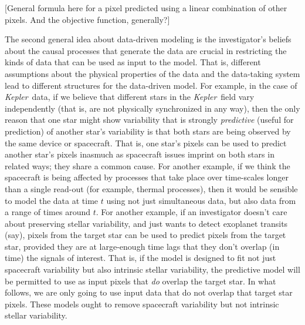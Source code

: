 \documentclass[12pt, preprint]{aastex}
\newcommand{\project}[1]{\textsl{#1}}
\newcommand{\Kepler}{\project{Kepler}}
\begin{document}
[General formula here for a pixel predicted using a linear combination of other pixels.
  And the objective function, generally?]

The second general idea about data-driven modeling is the investigator's beliefs
  about the causal processes that generate the data
  are crucial in restricting the kinds of data that can be used as input to the model.
That is, different assumptions about the physical properties of the data
  and the data-taking system
  lead to different structures for the data-driven model.
For example, in the case of \Kepler\ data,
  if we believe that different stars in the \Kepler\ field vary independently
  (that is, are not physically synchronized in any way),
  then the only reason that one star might show variability that is strongly \emph{predictive}
  (useful for prediction) of another star's variability
  is that both stars are being observed by the same device or spacecraft.
That is, one star's pixels can be used to predict another star's pixels
  inasmuch as spacecraft issues imprint on both stars in related ways;
  they share a common cause.
For another example, if we think the spacecraft is being affected by
  processes that take place over time-scales longer than a single read-out
  (for example, thermal processes),
  then it would be sensible to model the data at time $t$ using not just simultaneous data,
  but also data from a range of times around $t$.
For another example, if an investigator doesn't care about preserving stellar variability,
  and just wants to detect exoplanet transits (say),
  pixels from the target star can be used to predict pixels from the target star,
  provided they are at large-enough time lags that they don't overlap (in time)
  the signals of interest.
That is, if the model is designed to fit not just spacecraft variability
  but also intrinsic stellar variability,
  the predictive model will be permitted to use as input pixels that \emph{do} overlap the target star.
In what follows, we are only going to use input data that do not overlap that target star pixels.
These models ought to remove spacecraft variability but not intrinsic stellar variability.
\end{document}
